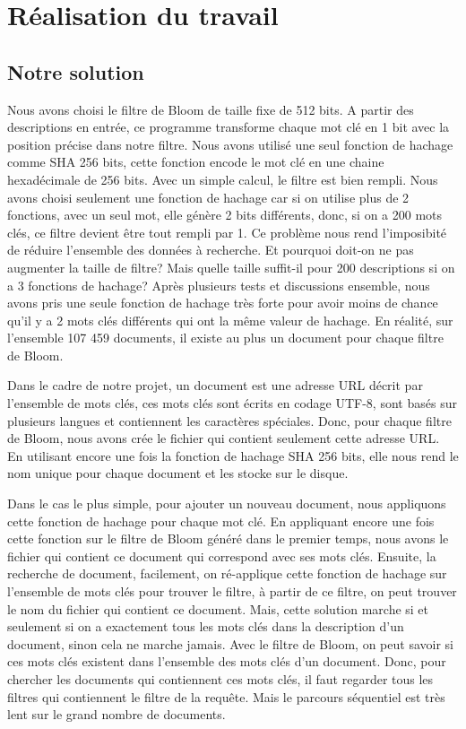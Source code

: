 \chapter{Réalisation du travail}
\section{Notre solution}
	Nous avons choisi le filtre de Bloom de taille fixe de 512 bits. A partir des descriptions en entrée, ce programme transforme chaque mot clé en 1 bit avec la position précise dans notre filtre. Nous avons utilisé une seul fonction de hachage comme SHA 256 bits, cette fonction encode le mot clé en une chaine hexadécimale de 256 bits. Avec un simple calcul, le filtre est bien rempli. Nous avons choisi seulement une fonction de hachage car si on utilise plus de 2 fonctions, avec un seul mot, elle génère 2 bits différents, donc, si on a 200 mots clés, ce filtre devient être tout rempli par 1. Ce problème nous rend l'imposibité de réduire l'ensemble des données à recherche. Et pourquoi doit-on ne pas augmenter la taille de filtre? Mais quelle taille suffit-il pour 200 descriptions si on a 3 fonctions de hachage? Après plusieurs tests et discussions ensemble, nous avons pris une seule fonction de hachage très forte pour avoir moins de chance qu'il y a 2 mots clés différents qui ont la même valeur de hachage. En réalité, sur l'ensemble 107 459 documents, il existe au plus un document pour chaque filtre de Bloom.
	
	Dans le cadre de notre projet, un document est une adresse URL décrit par l'ensemble de mots clés, ces mots clés sont écrits en codage UTF-8, sont basés sur plusieurs langues et contiennent les caractères spéciales. Donc, pour chaque filtre de Bloom, nous avons crée le fichier qui contient seulement cette adresse URL. En utilisant encore une fois la fonction de hachage SHA 256 bits, elle nous rend le nom unique pour chaque document et les stocke sur le disque.
	
	Dans le cas le plus simple, pour ajouter un nouveau document, nous appliquons cette fonction de hachage pour chaque mot clé. En appliquant encore une fois cette fonction sur le filtre de Bloom généré dans le premier temps, nous avons le fichier qui contient ce document qui correspond avec ses mots clés. Ensuite, la recherche de document, facilement, on ré-applique cette fonction de hachage sur l'ensemble de mots clés pour trouver le filtre, à partir de ce filtre, on peut trouver le nom du fichier qui contient ce document. Mais, cette solution marche si et seulement si on a exactement tous les mots clés dans la description d'un document, sinon cela ne marche jamais. Avec le filtre de Bloom, on peut savoir si ces mots clés existent dans l'ensemble des mots clés d'un document. Donc, pour chercher les documents qui contiennent ces mots clés, il faut regarder tous les filtres qui contiennent le filtre de la requête. Mais le parcours séquentiel est très lent sur le grand nombre de documents. 
	
